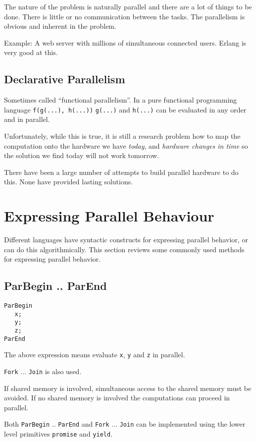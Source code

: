 \documentclass[10pt]{article}
\begin{document}
The nature of the problem is naturally parallel and there are a lot of
things to be done.  There is little or no communication between the
tasks. The parallelism is obvious and inherent in the problem.

Example: A web server with millions of simultaneous connected users.
Erlang is very good at this.

\subsection{Declarative Parallelism}

Sometimes called ``functional parallelism''. In a pure functional
programming language \verb+f(g(...), h(...))+ \verb+g(...)+ and
\verb+h(...)+ can be evaluated in any order and in parallel.

Unfortunately, while this is true, it is still a research problem how
to map the computation onto the hardware we have {\sl today}, and {\sl
  hardware changes in time} so the solution we find today will not
work tomorrow.

There have been a large number of attempts to build parallel hardware to
do this. None have provided lasting solutions.

\section{Expressing Parallel Behaviour}

Different languages have syntactic constructs for expressing parallel
behavior, or can do this algorithmically.  This section reviews some
commonly used methods for expressing parallel behavior.

\subsection{ParBegin .. ParEnd}

\begin{verbatim}
ParBegin
   x;
   y;
   z;
ParEnd
\end{verbatim}

The above expression means evaluate \verb+x+, \verb+y+ and \verb+z+ in parallel. 

\verb+Fork+ ... \verb+Join+ is also used.

If shared memory is involved, simultaneous access to the shared memory must be
avoided. If no shared memory is involved the computations can proceed in parallel.

Both \verb+ParBegin+ .. \verb+ParEnd+ and \verb+Fork+ ... \verb+Join+ can be 
implemented using the lower level primitives \verb+promise+ and \verb+yield+.
\end{document}

